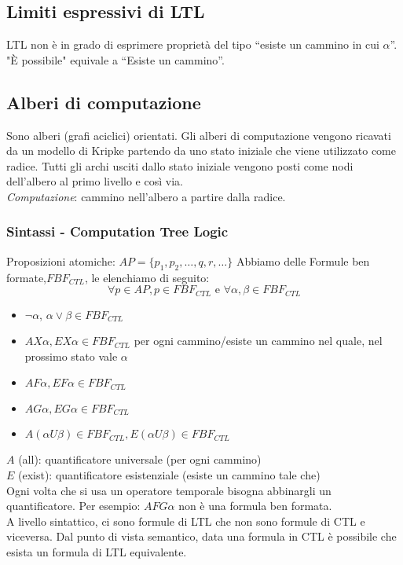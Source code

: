 \subsection{Limiti espressivi di LTL}
LTL non è in grado di esprimere proprietà del tipo “esiste un cammino in cui $\alpha$”.\\
"È possibile" equivale a “Esiste un cammino”.

\subsection{Alberi di computazione}
Sono alberi (grafi aciclici) orientati.
Gli alberi di computazione vengono ricavati da un modello di Kripke partendo da uno stato iniziale che viene utilizzato come radice. Tutti gli archi usciti dallo stato iniziale vengono posti come nodi dell’albero al primo livello e così via.\\
\textit{Computazione}: cammino nell’albero a partire dalla radice.

\subsubsection{Sintassi - Computation Tree Logic}
Proposizioni atomiche: $AP = \{p_1, p_2, \dots, q, r, \dots\}$
Abbiamo delle Formule ben formate,$FBF_{CTL}$, le elenchiamo di seguito: 
\[\forall p \in AP, p \in FBF_{CTL}  \mbox{ e } \forall \alpha, \beta \in FBF_{CTL}\]
\begin{itemize}
    \item $\neg \alpha$, $\alpha \lor \beta \in FBF_{CTL}$
    \item $A X \alpha, E X \alpha \in FBF_{CTL}$	per ogni cammino/esiste un cammino nel quale, nel prossimo stato vale $\alpha$
    \item $A F \alpha, E F \alpha \in FBF_{CTL}$	
    \item $AG \alpha, E G \alpha \in FBF_{CTL}$
    \item $A(\alpha U \beta) \in FBF_{CTL}, E(\alpha U \beta) \in FBF_{CTL}$
\end{itemize}

$A$ (all): quantificatore universale (per ogni cammino)\\
$E$ (exist): quantificatore esistenziale (esiste un cammino tale che)\\

Ogni volta che si usa un operatore temporale bisogna abbinargli un quantificatore. Per esempio: $AFG \alpha$ non è una formula ben formata.\\

A livello sintattico, ci sono formule di LTL che non sono formule di CTL e viceversa. Dal punto di vista semantico, data una formula in CTL è possibile che esista un formula di LTL equivalente.